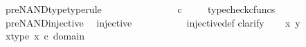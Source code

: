 \begin{isabellebody}
\isanewline
{}\isamarkupfalse%
\ pre{\isacharunderscore}{\kern0pt}NAND{\isacharunderscore}{\kern0pt}type{\isacharbrackleft}{\kern0pt}type{\isacharunderscore}{\kern0pt}rule{\isacharbrackright}{\kern0pt}{\isacharcolon}{\kern0pt}\ \isanewline
\ \ {\isachardoublequoteopen}{\isasymlangle}{\isasymf}{\isacharcomma}{\kern0pt}\ {\isasymf}{\isasymrangle}\ {\isasymamalg}\ {\isacharparenleft}{\kern0pt}{\isasymlangle}{\isasymt}{\isacharcomma}{\kern0pt}\ {\isasymf}{\isasymrangle}\ {\isasymamalg}\ {\isasymlangle}{\isasymf}{\isacharcomma}{\kern0pt}\ {\isasymt}{\isasymrangle}{\isacharparenright}{\kern0pt}\ {\isacharcolon}{\kern0pt}\ {\isasymone}{\isasymCoprod}{\isacharparenleft}{\kern0pt}{\isasymone}{\isasymCoprod}{\isasymone}{\isacharparenright}{\kern0pt}\ {\isasymrightarrow}\ {\isasymOmega}\ {\isasymtimes}\isactrlsub c\ {\isasymOmega}{\isachardoublequoteclose}\isanewline
%
\isadelimproof
\ \ %
\endisadelimproof
%
\isatagproof
{}\isamarkupfalse%
\ typecheck{\isacharunderscore}{\kern0pt}cfuncs%
\endisatagproof
{\isafoldproof}%
%
\isadelimproof
\isanewline
%
\endisadelimproof
\isanewline
{}\isamarkupfalse%
\ pre{\isacharunderscore}{\kern0pt}NAND{\isacharunderscore}{\kern0pt}injective{\isacharcolon}{\kern0pt}\isanewline
\ \ {\isachardoublequoteopen}injective{\isacharparenleft}{\kern0pt}{\isasymlangle}{\isasymf}{\isacharcomma}{\kern0pt}\ {\isasymf}{\isasymrangle}\ {\isasymamalg}\ {\isacharparenleft}{\kern0pt}{\isasymlangle}{\isasymt}{\isacharcomma}{\kern0pt}\ {\isasymf}{\isasymrangle}\ {\isasymamalg}\ {\isasymlangle}{\isasymf}{\isacharcomma}{\kern0pt}\ {\isasymt}{\isasymrangle}{\isacharparenright}{\kern0pt}{\isacharparenright}{\kern0pt}{\isachardoublequoteclose}\isanewline
%
\isadelimproof
\ \ %
\endisadelimproof
%
\isatagproof
{}\isamarkupfalse%
\ injective{\isacharunderscore}{\kern0pt}def\isanewline
{}\isamarkupfalse%
{\isacharparenleft}{\kern0pt}clarify{\isacharparenright}{\kern0pt}\isanewline
\ \ \isamarkupfalse%
\ x\ y\ \isanewline
\ \ \isamarkupfalse%
\ x{\isacharunderscore}{\kern0pt}type{\isacharcolon}{\kern0pt}\ {\isachardoublequoteopen}x\ {\isasymin}\isactrlsub c\ domain\ {\isacharparenleft}{\kern0pt}{\isasymlangle}{\isasymf}{\isacharcomma}{\kern0pt}\ {\isasymf}{\isasymrangle}\ {\isasymamalg}\ {\isasymlangle}{\isasymt}{\isacharcomma}{\kern0pt}{\isasymf}{\isasymrangle}\ {\isasymamalg}\ {\isasymlangle}{\isasymf}{\isacharcomma}{\kern0pt}{\isasymt}{\isasymrangle}{\isacharparenright}{\kern0pt}{\isachardoublequoteclose}\ \isanewline
\ \ \isamarkupfalse%

\end{isabellebody}
